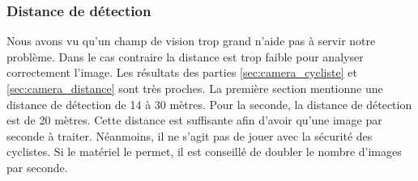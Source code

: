 \subsubsection*{Distance de détection}
Nous avons vu qu'un champ de vision trop grand n'aide pas à servir notre problème. Dans le cas contraire la distance est trop faible pour analyser correctement l'image.
Les résultats des parties \ref{sec:camera_cycliste} et \ref{sec:camera_distance} sont très proches.
La première section mentionne une distance de détection de 14 à 30 mètres. Pour la seconde, la distance de détection est de 20 mètres.
Cette distance est suffisante afin d'avoir qu'une image par seconde à traiter. Néanmoins, il ne s'agit pas de jouer avec la sécurité des cyclistes.
Si le matériel le permet, il est conseillé de doubler le nombre d'images par seconde.
